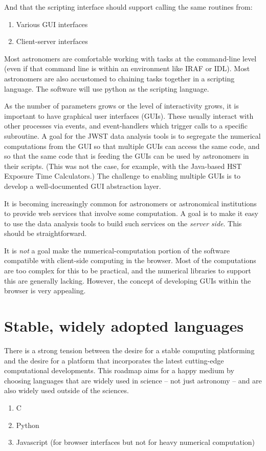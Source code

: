 \documentclass[letterpaper,10pt,english]{sphinxmanual}
\begin{document}
And that the scripting interface should support calling the
same routines from:
\begin{enumerate}
\item {} 
Various GUI interfaces

\item {} 
Client-server interfaces

\end{enumerate}

Most astronomers are comfortable working with tasks at the command-line
level (even if that command line is within an environment like IRAF or IDL).
Most astronomers are also accustomed to chaining tasks together
in a scripting language. The software will use python as the scripting language.

As the number of parameters grows or the level of interactivity grows, it is
important to have graphical user interfaces (GUIs). These usually interact
with other processes via events, and event-handlers which trigger calls to
a specific subroutine. A goal for the JWST data analysis tools is to segregate
the numerical computations from the GUI so that multiple GUIs can access
the same code, and so that the same code that is feeding the GUIs can be used
by astronomers in their scripts. (This was not the case, for example, with
the Java-based HST Exposure Time Calculators.) The challenge to enabling
multiple GUIs is to develop a well-documented GUI abstraction layer.

It is becoming increasingly common for astronomers or astronomical institutions
to provide web services that involve some computation. A goal is to make
it easy to use the data analysis tools to build such services on the \emph{server side}.
This should be straightforward.

It is \emph{not} a goal make the numerical-computation portion of the software compatible
with client-side computing in the browser. Most of the computations are too
complex for this to be practical, and the numerical libraries to support this
are generally lacking. However, the concept of developing GUIs within the browser
is very appealing.


\section{Stable, widely adopted languages}
\label{intro:stable-widely-adopted-languages}
There is a strong tension between the desire for a stable computing
platforming and the desire for a platform that incorporates
the latest cutting-edge computational developments. This roadmap aims for
a happy medium by choosing languages that are widely used
in science -- not just astronomy -- and are also widely used outside
of the sciences.
\begin{enumerate}
\item {} 
C

\item {} 
Python

\item {} 
Javascript (for browser interfaces but not for heavy numerical computation)

\end{enumerate}
\end{document}
